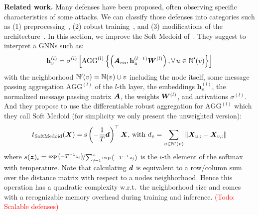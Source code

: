 \documentclass[sigconf,authordraft]{acmart}
\newcommand{\adj}{\mA}
\newcommand{\weight}{\mW}
\newcommand{\features}{\mX}
\newcommand{\neighbors}{\sN}
\newcommand{\todo}[1]{\textcolor{red}{(Todo: #1)}}
\begin{document}
\textbf{Related work.} Many defenses have been proposed, often observing specific characteristics of some attacks. We can classify those defenses into categories such as (1) preprocessing~\citep{Entezari2020,Wu2019}, (2) robust training~\citep{Xu2019a, Zugner2019a}, and (3) modifications of the architecture~\citep{Zhu2019, Zhang2019a,Geisler2020}. In this section, we improve the Soft Medoid of~\cite{Geisler2020}. They suggest to interpret a GNNs such as:
\begin{equation}\label{eq:mean-how-powerfull}
  \mathbf{h}^{(l)}_v = \sigma^{(l)} \left[ \text{AGG}^{(l)} \left \{ \left( \adj_{vu}, \mathbf{h}^{(l-1)}_u \weight^{(l)} \right), \forall \, u\in \neighbors'(v) \right \} \right]
\end{equation}
with the neighborhood \(\neighbors'(v) = \neighbors(v) \cup v\) including the node itself, some message passing aggregation \(\text{AGG}^{(l)}\) of the \(l\)-th layer, the embeddings \(\mathbf{h}^{(l)}_v\), the normalized message passing matrix \(\adj\), the weights \(\weight^{(l)}\), and activations \( \sigma^{(l)}\). And they propose to use the differentiable robust aggregation for \(\text{AGG}^{(l)}\) which they call Soft Medoid (for simplicity we only present the unweighted version):
\begin{equation}\label{eq:softoutsoftmedoid}
  t_{\text{SoftMedoid}}(\features)
  = \text{s}\left(-\frac{1}{T} \vd \right)^\top \features \text{,~with}~\evd_{v} = \sum_{u\in \neighbors'(v)} \|\features_{u,:} - \features_{v,:}\| 
\end{equation}
where \(s({\bm{z}})_i = \nicefrac{\exp{\left(-T^{-1} {z}_i \right )}}{\sum_{j=1}^n \exp{\left(-T^{-1} {z}_j \right )}}\) is the \(i\)-th element of the softmax with temperature. Note that calculating \({\bm{d}}\) is equivalent to a row/column sum over the distance matrix with respect to a nodes neighborhood. Hence this operation has a quadratic complexity w.r.t.\ the neighborhood size and comes with a recognizable memory overhead during training and inference. \todo{Scalable defenses}
\end{document}

